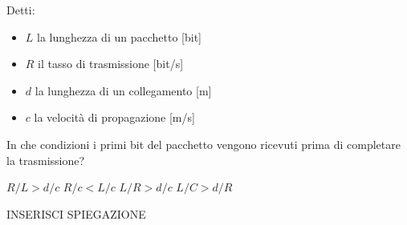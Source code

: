 \question
Detti:
\begin{itemize}
	\item \(L\) la lunghezza di un pacchetto [bit]
	\item \(R\) il tasso di trasmissione [bit/s]
	\item \(d\) la lunghezza di un collegamento [m]
	\item \(c\) la velocità di propagazione [m/s]
\end{itemize}
In che condizioni i primi bit del pacchetto vengono ricevuti prima di completare la trasmissione?

\begin{checkboxes}
	\choice \(R/L > d/c\)
	\choice \(R/c < L/c\)
	\CorrectChoice \(L/R > d/c\)
	\choice \(L/C > d/R\)
\end{checkboxes}

\begin{solution}
INSERISCI SPIEGAZIONE
\end{solution}

